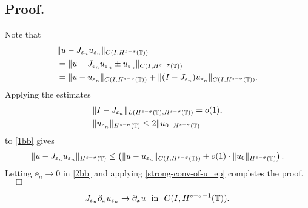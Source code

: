 			\subsection{ Proof.} Note that
			\begin{equation}
				\begin{split}
					& \| u -  J_{\varepsilon_n} u_{\varepsilon_n}
					\|_{C(I, H^{s-\sigma}(\mathbb{T}))}
					\\
					&= \| u -  J_{\varepsilon_n} u_{\varepsilon_n} \pm 
					u_{\varepsilon_n} \|_{C(I, H^{s-\sigma}(\mathbb{T}))}
					\\
					& = \| u -  u_{\varepsilon_n}
					\|_{C(I,H^{s-\sigma}(\mathbb{T}))} + \| (I - J_{\varepsilon_n})
					u_{\varepsilon_n} \|_{C(I, H^{s-\sigma}(\mathbb{T}))}.
					\label{1bb}
				\end{split}
			\end{equation}
			Applying the estimates
			\begin{equation*}
				\begin{split}
					& \|I-J_{\varepsilon_n} \|_{L(H^{s-\sigma}(\mathbb{T}), H^{s -
					\sigma}(\mathbb{T}))} = o(1),
					\\
					& \|u_{\varepsilon_n}\|_{H^{s-\sigma}(\mathbb{T})} \le 2
					\|u_0\|_{H^{s-\sigma}(\mathbb{T})}
				\end{split}
			\end{equation*}
			to \eqref{1bb} gives
			\begin{equation}
				\label{2bb}
				\begin{split}
					\| u -  J_{\varepsilon_n} u_{\varepsilon_n}\|_{H^{s-\sigma}(\mathbb{T})}
					\le \left( \| u -  u_{\varepsilon_n}
					\|_{C(I, H^{s-\sigma}(\mathbb{T}))} + o(1) \cdot \|u_0
					\|_{H^{s-\sigma}(\mathbb{T})} \right).
				\end{split}
			\end{equation}
			Letting $\ee_n \to 0$ in \eqref{2bb} and applying
			\eqref{strong-conv-of-u_ep} completes the proof. $\quad \Box$
			\begin{proposition}
				\label{prop:dd}
				\begin{equation}
					\begin{split}
						 J_{\varepsilon_n} \partial_x u_{\varepsilon_n} \to  \partial_x u \ \
						\text{in} \ \ C(I, H^{s-\sigma-1}(\mathbb{T})).
						\label{0dd}
					\end{split}
				\end{equation}
			\end{proposition}

